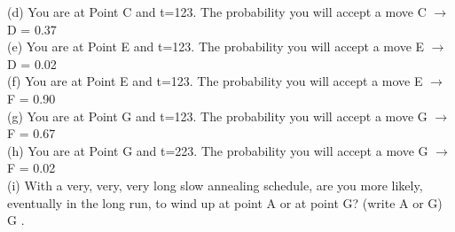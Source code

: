 \documentclass{article}
\begin{document}
\noindent (d) You are at Point C and t=123. The probability you will accept a move C $\to$ D = 0.37 \\

\noindent (e) You are at Point E and t=123. The probability you will accept a move E $\to$ D = 0.02 \\

\noindent (f) You are at Point E and t=123. The probability you will accept a move E $\to$ F = 0.90 \\

\noindent (g) You are at Point G and t=123. The probability you will accept a move G $\to$ F = 0.67 \\

\noindent (h) You are at Point G and t=223. The probability you will accept a move G $\to$ F =  0.02 \\

\noindent (i) With a very, very, very long slow annealing schedule, are you more likely, eventually in the long run,
to wind up at point A or at point G? (write A or G)  G .
\end{document}
